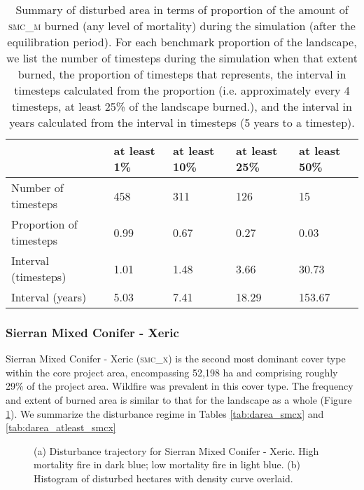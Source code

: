 \begin{table}[!htbp]
\centering
\caption{Summary of disturbed area in terms of proportion of the amount of \textsc{smc\_m} burned (any level of mortality) during the simulation (after the equilibration period). For each benchmark proportion of the landscape, we list the number of timesteps during the simulation when that extent burned, the proportion of timesteps that represents, the interval in timesteps calculated from the proportion (i.e. approximately every 4 timesteps, at least 25\% of the landscape burned.), and the interval in years calculated from the interval in timesteps (5 years to a timestep).}
\label{tab:darea_atleast_smcm}
\begin{tabular}{@{}lllll@{}}
                        & at least 1\% & at least 10\% & at least 25\% & at least 50\% \\ \midrule
Number of timesteps     & 458          & 311           & 126           & 15            \\
Proportion of timesteps & 0.99         & 0.67          & 0.27          & 0.03          \\
Interval (timesteps)    & 1.01         & 1.48          & 3.66          & 30.73         \\
Interval (years)        & 5.03         & 7.41          & 18.29         & 153.67       \\ \bottomrule
\end{tabular}
\end{table}

\clearpage


\subsubsection{Sierran Mixed Conifer - Xeric}
Sierran Mixed Conifer - Xeric (\textsc{smc\_x}) is the second most dominant cover type within the core project area, encompassing 52,198 ha and comprising roughly 29\% of the project area. Wildfire was prevalent in this cover type. The frequency and extent of burned area is similar to that for the landscape as a whole (Figure \ref{fig:darea_smcx}). We summarize the disturbance regime in Tables \ref{tab:darea_smcx} and \ref{tab:darea_atleast_smcx}

\begin{figure}[!htbp]
  \centering
  \caption{\small (a) Disturbance trajectory for Sierran Mixed Conifer - Xeric. High mortality fire in dark blue; low mortality fire in light blue. (b) Histogram of disturbed hectares with density curve overlaid.} 
  \label{fig:darea_smcx}
\end{figure}

